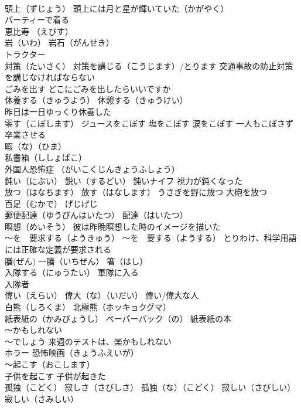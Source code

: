 \documentclass[8pt]{extreport}
\begin{document}
\begin{CJK}{UTF8}{min}
\\	頭上（ずじょう） 頭上には月と星が輝いていた（かがやく）
\\	パーティーで着る
\\	恵比寿 （えびす）
\\	岩（いわ） 岩石（がんせき）
\\	トラクター
\\	対策（たいさく） 対策を講じる（こうじます）/とります 交通事故の防止対策を講じなければならない
\\	ごみを出す どこにごみを出したらいいですか
\\	休養する（きゅうよう） 休憩する（きゅうけい）
\\	昨日は一日ゆっくり休養した
\\	零す（こぼします） ジュースをこぼす 塩をこぼす 涙をこぼす 一人もこぼさず卒業させる
\\	暇（な）（ひま）
\\	私書箱（ししょばこ）
\\	外国人恐怖症 （がいこくじんきょうふしょう）
\\	鈍い（にぶい） 鋭い（するどい） 鈍いナイフ 視力が鈍くなった
\\	放つ（はなちます） 放す（はなします） うさぎを野に放つ 大砲を放つ
\\	百足（むかで） げじげじ
\\	郵便配達（ゆうびんはいたつ） 配達（はいたつ）
\\	瞑想（めいそう） 彼は昨晩瞑想した時のイメージを描いた
\\	～を　要求する（ようきゅう） ～を　要する（ようする） とりわけ、科学用語には正確な定義が要求される
\\	膳(ぜん) 一膳（いちぜん） 箸（はし）
\\	入隊する（にゅうたい） 軍隊に入る 
\\	入隊者
\\	偉い（えらい） 偉大（な）（いだい） 偉い/偉大な人
\\	白熊（しろくま） 北極熊（ホッキョクグマ）
\\	紙表紙の（かみびょうし） ペーパーバック（の） 紙表紙の本
\\	～かもしれない 
\\	～でしょう 来週のテストは、楽かもしれない
\\	ホラー 恐怖映画（きょうふえいが）
\\	～起こす（おこします） 
\\	子供を起こす 子供が起きた
\\	孤独（こどく） 寂しさ（さびしさ） 孤独（な）（こどく） 寂しい（さびしい） 寂しい（さみしい）

\end{CJK}
\end{document}
